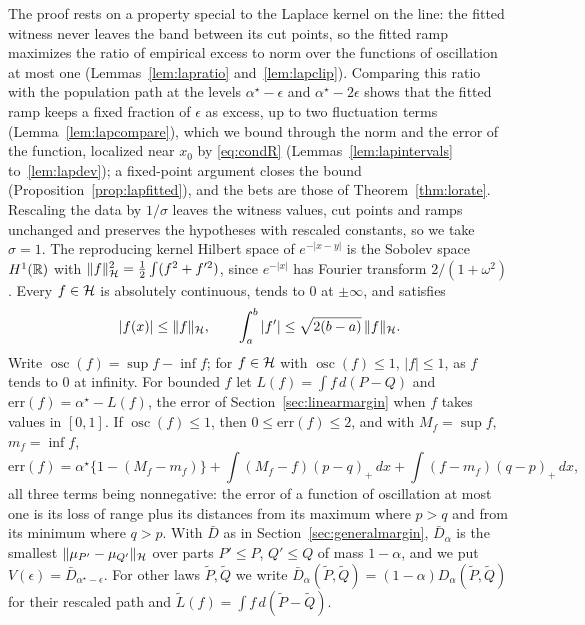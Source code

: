 The proof rests on a property special to the Laplace kernel on the line: the fitted witness never leaves the band
between its cut points, so the fitted ramp maximizes the ratio of empirical excess to norm over the functions of oscillation at most
one (Lemmas~\ref{lem:lapratio} and~\ref{lem:lapclip}). Comparing this ratio with the population path at the levels
$\alpha^\star-\epsilon$ and $\alpha^\star-2\epsilon$ shows that the fitted ramp keeps a fixed fraction of $\epsilon$ as
excess, up to two fluctuation terms (Lemma~\ref{lem:lapcompare}), which we bound through the norm and the error of the
function, localized near $x_0$ by \eqref{eq:condR} (Lemmas~\ref{lem:lapintervals} to~\ref{lem:lapdev}); a fixed-point
argument closes the bound (Proposition~\ref{prop:lapfitted}), and the bets are those of Theorem~\ref{thm:lorate}. Rescaling the data by $1/\sigma$ leaves the witness values, cut points and ramps unchanged and
preserves the hypotheses with rescaled constants, so we take $\sigma=1$. The reproducing kernel Hilbert space of
$e^{-|x-y|}$ is the Sobolev space $H^1(\mathbb{R})$ with $\|f\|_{\mathcal{H}}^2=\tfrac12\int(f^2+f'^2)$, since $e^{-|x|}$ has Fourier
transform $2/(1+\omega^2)$ \citep[Theorem~10.12]{wendland2005scattered}. Every $f\in\mathcal{H}$ is absolutely continuous,
tends to $0$ at $\pm\infty$, and satisfies
\begin{equation}
|f(x)|\le\|f\|_{\mathcal{H}},\qquad\int_a^b|f'|\le\sqrt{2(b-a)}\,\|f\|_{\mathcal{H}} .
\label{eq:laphone}
\end{equation}
Write $\operatorname{osc}(f)=\sup f-\inf f$; for $f\in\mathcal{H}$ with $\operatorname{osc}(f)\le1$, $|f|\le1$, as $f$ tends to
$0$ at infinity. For bounded $f$ let
$L(f)=\int f\,d(P-Q)$ and $\mathrm{err}(f)=\alpha^\star-L(f)$, the error of Section~\ref{sec:linearmargin} when $f$ takes
values in $[0,1]$. If $\operatorname{osc}(f)\le1$, then $0\le\mathrm{err}(f)\le2$, and with $M_f=\sup f$, $m_f=\inf f$,
\begin{equation}
\mathrm{err}(f)=\alpha^\star\{1-(M_f-m_f)\}+\int(M_f-f)(p-q)_+\,dx+\int(f-m_f)(q-p)_+\,dx ,
\label{eq:laperr}
\end{equation}
all three terms being nonnegative: the error of a function of oscillation at most one is its loss of range plus its
distances from its maximum where $p>q$ and from its minimum where $q>p$. With $\bar D$ as in
Section~\ref{sec:generalmargin}, $\bar D_\alpha$ is the smallest $\|\mu_{P'}-\mu_{Q'}\|_{\mathcal{H}}$ over parts $P'\le P$,
$Q'\le Q$ of mass $1-\alpha$, and we put
$V(\epsilon)=\bar D_{\alpha^\star-\epsilon}$. For other laws $\tilde P,\tilde Q$ we write $\bar D_\alpha(\tilde P,\tilde Q)=(1-\alpha)D_\alpha(\tilde P,\tilde Q)$ for
their rescaled path and $\tilde L(f)=\int f\,d(\tilde P-\tilde Q)$.

